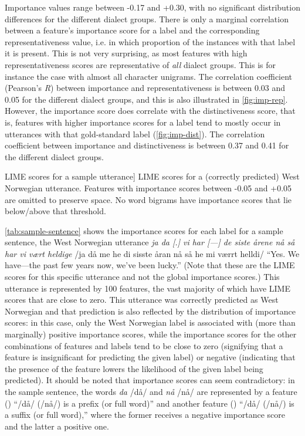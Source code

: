 Importance values range between -0.17 and +0.30, with no significant distribution differences for the different dialect groups.
There is only a marginal correlation between a feature's importance score for a label and the corresponding representativeness value, i.e. in which proportion of the instances with that label it is present.
This is not very surprising, as most features with high representativeness scores are representative of \textit{all} dialect groups.
This is for instance the case with almost all character unigrams.
The correlation coefficient (Pearson's \textit{R}) between importance and representativeness is between 0.03 and 0.05 for the different dialect groups,
and this is also illustrated in \autoref{fig:imp-rep}.
However, the importance score does correlate with the distinctiveness score, that is, features with higher importance scores for a label tend to mostly occur in utterances with that gold-standard label (\autoref{fig:imp-dist}).
The correlation coefficient between importance and distinctiveness is between 0.37 and 0.41 for the different dialect groups.


\begin{table}[htbp]
    
    \caption
    [LIME scores for a sample utterance]
    {LIME scores for a (correctly predicted) West Norwegian utterance.
    Features with importance scores between -0.05 and +0.05 are omitted to preserve space.
    No word bigrams have importance scores that lie below/above that threshold.}
    \label{tab:sample-sentence}
\end{table}

\autoref{tab:sample-sentence} shows the importance scores for each label for a sample sentence, the West Norwegian utterance \textit{ja da [.] vi har [---] de siste årene nå så har vi vært heldige}
/ja då me he di sisste åran nå så he mi værrt helldi/
``Yes. We have---the past few years now, we've been lucky.''
(Note that these are the LIME scores for this specific utterance and not the global importance scores.)
This utterance is represented by 100 features, the vast majority of which have LIME scores that are close to zero.
This utterance was correctly predicted as West Norwegian and that prediction is also reflected by the distribution of importance scores: in this case, only the West Norwegian label is associated with (more than marginally) positive importance scores, while the importance scores for the other combinations of features and labels tend to be close to zero (signifying that a feature is insignificant for predicting the given label) or negative (indicating that the presence of the feature lowers the likelihood of the given label being predicted).
It should be noted that importance scores can seem contradictory: in the sample sentence, the words \textit{da} /d\aa/ and \textit{n\aa} /n\aa/ are represented by a feature  () ``/d\aa/ (/n\aa/) is a prefix (or full word)'' and another feature  () ``/d\aa/ (/n\aa/) is a suffix (or full word),'' where the former receives a negative importance score and the latter a positive one.



